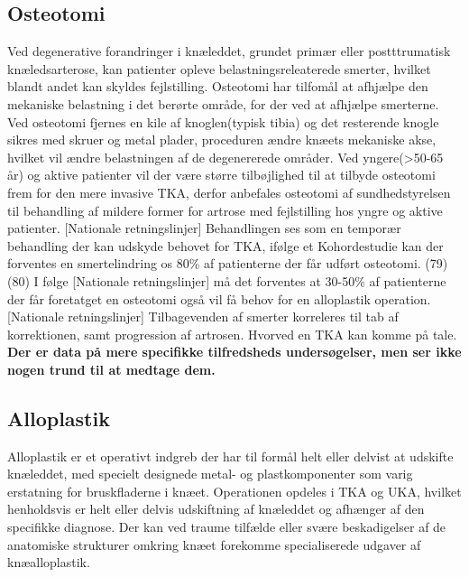 \subsection{Osteotomi}
Ved degenerative forandringer i knæleddet, grundet primær eller postttrumatisk knæledsarterose, kan patienter opleve belastningsreleaterede smerter, hvilket blandt andet kan skyldes fejlstilling. Osteotomi har tilfomål at afhjælpe den mekaniske belastning i det berørte område, for der ved at afhjælpe smerterne. Ved osteotomi fjernes en kile af knoglen(typisk tibia) og det resterende knogle sikres med skruer og metal plader, proceduren ændre knæets mekaniske akse, hvilket vil ændre belastningen af de degenererede områder.\citep{Osteotomi_og_TKA} Ved yngere(>50-65 år)\citep{Osteotomi_og_TKA} og aktive patienter vil der være større tilbøjlighed til at tilbyde osteotomi frem for den mere invasive TKA, derfor anbefales osteotomi af sundhedstyrelsen til behandling af mildere former for artrose med fejlstilling hos yngre og aktive patienter. [Nationale retningslinjer] Behandlingen ses som en temporær behandling der kan udskyde behovet for TKA, ifølge et Kohordestudie kan der forventes en smertelindring os 80\% af patienterne der får udført osteotomi. (79)(80) I følge [Nationale retningslinjer] må det forventes at 30-50\% af patienterne der får foretatget en osteotomi også vil få behov for en alloplastik operation. [Nationale retningslinjer] Tilbagevenden af smerter korreleres til tab af korrektionen, samt progression af artrosen. Hvorved en TKA kan komme på tale. \citep{Osteotomi_og_TKA} \textbf{Der er data på mere specifikke tilfredsheds undersøgelser, men ser ikke nogen trund til at medtage dem. }

\subsection{Alloplastik}
Alloplastik er et operativt indgreb der har til formål helt eller delvist at udskifte knæleddet, med specielt designede metal- og plastkomponenter som varig erstatning for bruskfladerne i knæet. Operationen opdeles i TKA og UKA, hvilket henholdsvis er helt eller delvis udskiftning af knæleddet og afhænger af den specifikke diagnose. Der kan ved traume tilfælde eller svære beskadigelser af de anatomiske strukturer omkring knæet forekomme specialiserede udgaver af knæalloplastik.


